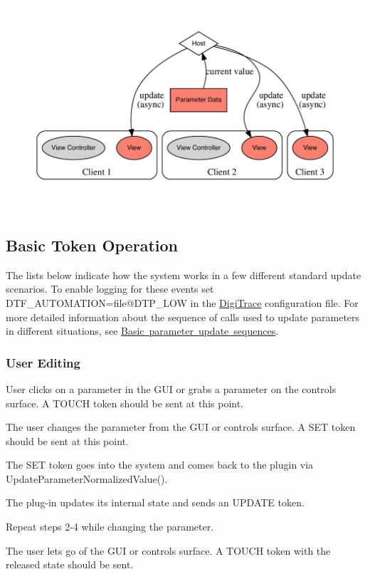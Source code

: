 \begin{DoxyImage}
\includegraphics[width=\textwidth,height=\textheight/2,keepaspectratio=true]{dot_aax_parameter_entities_curvalue}
\end{DoxyImage}


 \hypertarget{a00822_tokenProtocol_standardTokenOperation}{}\subsection{Basic Token Operation}\label{a00822_tokenProtocol_standardTokenOperation}
The lists below indicate how the system works in a few different standard update scenarios. To enable logging for these events set {\ttfamily D\+T\+F\+\_\+\+A\+U\+T\+O\+M\+A\+T\+I\+ON=file@D\+T\+P\+\_\+\+L\+OW} in the \mbox{\hyperlink{a00834}{Digi\+Trace}} configuration file. For more detailed information about the sequence of calls used to update parameters in different situations, see \mbox{\hyperlink{a00823}{Basic parameter update sequences}}.

\hypertarget{a00822_tokenProtocol_standardTokenOperation_userEditing}{}\subsubsection{User Editing}\label{a00822_tokenProtocol_standardTokenOperation_userEditing}

\begin{DoxyEnumerate}
\item User clicks on a parameter in the G\+UI or grabs a parameter on the controls surface. A T\+O\+U\+CH token should be sent at this point.
\item The user changes the parameter from the G\+UI or controls surface. A S\+ET token should be sent at this point.
\item The S\+ET token goes into the system and comes back to the plugin via Update\+Parameter\+Normalized\+Value().
\item The plug-\/in updates it\textquotesingle{}s internal state and sends an U\+P\+D\+A\+TE token.
\item Repeat steps 2-\/4 while changing the parameter.
\item The user lets go of the G\+UI or controls surface. A T\+O\+U\+CH token with the released state should be sent.
\end{DoxyEnumerate}

